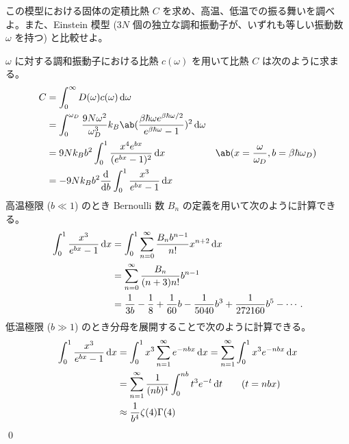 \documentclass[uplatex,dvipdfmx,a4paper,11pt]{jlreq}
\makeatletter
\numberwithin{equation}{section}
\theoremstyle{definition}
\renewenvironment{proof}[1][\proofname]{\par
  \normalfont
  \topsep6\p@\@plus6\p@ \trivlist
  \item[\hskip\labelsep{\bfseries #1}\@addpunct{\bfseries}]\ignorespaces\quad\par
}{%
  \qed\endtrivlist\@endpefalse
}
\renewcommand\proofname{証明}
\makeatother
\begin{document}
\begin{problem}
この模型における固体の定積比熱 $C$ を求め、高温、低温での振る舞いを調べよ。また、Einstein 模型 ($3N$ 個の独立な調和振動子が、いずれも等しい振動数 $\omega$ を持つ) と比較せよ。
\end{problem}
\begin{proof}
  $\omega$ に対する調和振動子における比熱 $c(\omega)$ を用いて比熱 $C$ は次のように求まる。
  \begin{align}
    C & = \int_0^\infty D(\omega)c(\omega)\dl{\omega}                                                                                                                                                            \\
      & = \int_0^{\omega_D}\frac{9N\omega^2}{\omega_D^3}k_B\ab(\frac{\beta\hbar\omega e^{\beta\hbar\omega/2}}{e^{\beta\hbar\omega} - 1})^2\dl{\omega}                                                            \\
      & = 9Nk_Bb^2\int_0^1\frac{x^4e^{bx}}{(e^{bx} - 1)^2}\dl{x}                                                                                      & \ab(x = \frac{\omega}{\omega_D}, b = \beta\hbar\omega_D) \\
      & = -9Nk_Bb^2\diff{}{b}\int_0^1\frac{x^3}{e^{bx} - 1}\dl{x}
  \end{align}
  高温極限 ($b \ll 1$) のとき Bernoulli 数 $B_n$ の定義を用いて次のように計算できる。
  \begin{align}
    \int_0^1\frac{x^3}{e^{bx} - 1}\dl{x} & = \int_0^1\sum_{n=0}^{\infty}\frac{B_n b^{n-1}}{n!}x^{n+2}\dl{x}                                 \\
                                         & = \sum_{n=0}^{\infty}\frac{B_n}{(n + 3)n!}b^{n-1}                                                \\
                                         & = \frac{1}{3b} - \frac{1}{8} + \frac{1}{60}b - \frac{1}{5040}b^3 + \frac{1}{272160}b^5 - \cdots.
  \end{align}
  低温極限 ($b \gg 1$) のとき分母を展開することで次のように計算できる。
  \begin{align}
    \int_0^1\frac{x^3}{e^{bx} - 1}\dl{x} & = \int_0^1x^3\sum_{n=1}^{\infty}e^{-nbx}\dl{x} = \sum_{n=1}^{\infty}\int_0^1x^3e^{-nbx}\dl{x} \\
                                         & = \sum_{n=1}^{\infty}\frac{1}{(nb)^4}\int_0^{nb}t^3e^{-t}\dl{t} \qquad (t = nbx)              \\
                                         & \approx \frac{1}{b^4}\zeta(4)\Gamma(4)                                                        \\

\end{align}
\end{proof}
\end{document}
